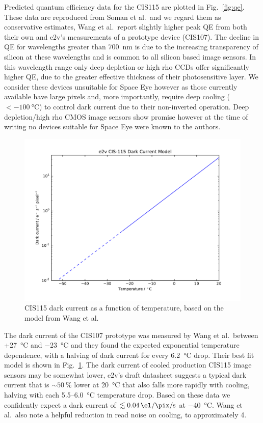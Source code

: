 \documentclass[]{iac}
\begin{document}
Predicted quantum efficiency data for the CIS115 are plotted in Fig.~\ref{fig:qe}. These data are reproduced from Soman
et al.\cite{Soman2014}\ and we regard them as conservative estimates, Wang et al.\cite{Wang2014}\ report slightly higher
peak QE from both their own and e2v's measurements of a prototype device (CIS107). The decline in QE for wavelengths
greater than \SI{700}{\nano\metre} is due to the increasing transparency of silicon at these wavelengths and is common
to all silicon based image sensors. In this wavelength range only deep depletion or high rho CCDs offer significantly
higher QE, due to the greater effective thickness of their photosensitive layer. We consider these devices unsuitable
for Space Eye however as those currently available have large pixels and, more importantly, require deep cooling
($<\SI{-100}{\celsius}$) to control dark current due to their non-inverted operation. Deep depletion/high rho CMOS image
sensors show promise however at the time of writing no devices suitable for Space Eye were known to the authors.

\begin{figure}[tp]
  \center \includegraphics[width=\columnwidth]{figures/CIS115DC.pdf}
  \caption{\label{fig:dc}CIS115 dark current as a function of temperature, based on the model from Wang et al.
    \cite{Wang2014}}
\end{figure}

The dark current of the CIS107 prototype was measured by Wang et al.\ between +\SI{27}{\celsius} and \SI{-23}{\celsius}
and they found the expected exponential temperature dependence, with a halving of dark current for every
\SI{6.2}{\celsius} drop. Their best fit model is shown in Fig.~\ref{fig:dc}. The dark current of cooled production
CIS115 image sensors may be somewhat lower, e2v's draft datasheet suggests a typical dark current that is
$\sim\SI{50}{\percent}$ lower at \SI{20}{\celsius} that also falls more rapidly with cooling, halving with each
5.5--\SI{6.0}{\celsius} temperature drop. Based on these data we confidently expect a dark current of
$\lesssim\SI{0.04}{\el\per\pix\per\second}$ at \SI{-40}{\celsius}. Wang et al.\ also note a helpful reduction in read
noise on cooling, to approximately \SI{4}{\el}.
\end{document}
